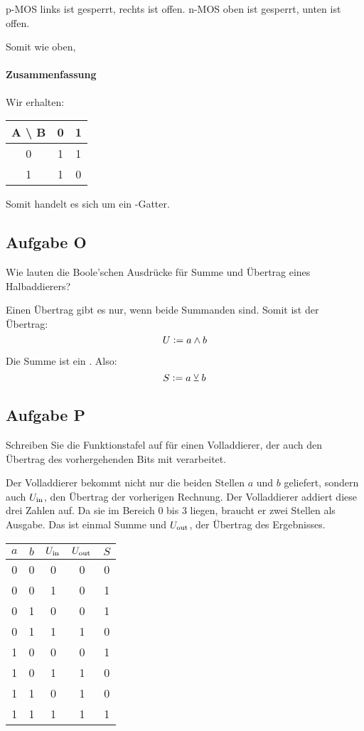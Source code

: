 p-MOS links ist gesperrt, rechts ist offen. n-MOS oben ist gesperrt, unten ist
offen.

Somit wie oben, \thigh

\paragraph{Zusammenfassung}

Wir erhalten:

\begin{tabular}{c|cc}
	A \textbackslash{} B & 0 & 1 \\
	\hline
	0 & 1 & 1 \\
	1 & 1 & 0
\end{tabular}

Somit handelt es sich um ein \tnand-Gatter.

\FloatBarrier
\subsection{Aufgabe O}

\begin{problem}
	Wie lauten die Boole'schen Ausdrücke für Summe und Übertrag eines
	Halbaddierers?
\end{problem}

Einen Übertrag gibt es nur, wenn beide Summanden \thigh{} sind. Somit ist der
Übertrag:
\[
	U := a \wedge b
\]

Die Summe ist ein \txor. Also:
\[
	S := a \veebar b
\]

\FloatBarrier
\subsection{Aufgabe P}

\begin{problem}
	Schreiben Sie die Funktionstafel auf für einen Volladdierer, der auch den
	Übertrag des vorhergehenden Bits mit verarbeitet.
\end{problem}

Der Volladdierer bekommt nicht nur die beiden Stellen $a$ und $b$ geliefert,
sondern auch $U_\text{in}$, den Übertrag der vorherigen Rechnung. Der Volladdierer
addiert diese drei Zahlen auf. Da sie im Bereich 0 bis 3 liegen, braucht er
zwei Stellen als Ausgabe. Das ist einmal Summe und $U_\text{out}$, der Übertrag des
Ergebnisses.

\begin{tabular}{ccc|cc}
	$a$ & $b$ & $U_\text{in}$ & $U_\text{out}$ & $S$ \\
	\hline
	0 & 0 & 0 & 0 & 0 \\
	0 & 0 & 1 & 0 & 1 \\
	0 & 1 & 0 & 0 & 1 \\
	0 & 1 & 1 & 1 & 0 \\
	1 & 0 & 0 & 0 & 1 \\
	1 & 0 & 1 & 1 & 0 \\
	1 & 1 & 0 & 1 & 0 \\
	1 & 1 & 1 & 1 & 1 \\
\end{tabular}

